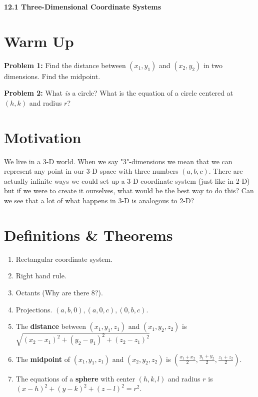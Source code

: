 \documentclass[11pt]{article}
\newcommand{\vs}{\vspace*{.1in}}
\begin{document}
\begin{LARGE}\begin{center}\bf 12.1 Three-Dimensional Coordinate Systems\end{center}
\end{LARGE}

\vs\vs



\section{Warm Up}

\textbf{Problem 1:} Find the distance between $(x_1,y_1)$ and $(x_2,y_2)$ in two dimensions. Find the midpoint. 

\textbf{Problem 2:} What \emph{is} a circle? What is the equation of a circle centered at $(h,k)$ and radius $r$?

\section{Motivation}

We live in a 3-D world. When we say "3"-dimensions we mean that we can represent any point in our 3-D space with three numbers $(a,b,c)$. There are actually infinite ways we could set up a 3-D coordinate system (just like in 2-D) but if we were to create it ourselves, what would be the best way to do this? Can we see that a lot of what happens in 3-D is analogous to 2-D? 


\section{Definitions \& Theorems}

\begin{enumerate}
    \item  Rectangular coordinate system.
    \item  Right hand rule.
    \item Octants (Why are there 8?).
    \item  Projections. $(a,b,0), (a,0,c), (0,b,c)$.

\item  The \textbf{distance} between $(x_1,y_1,z_1)$ and $(x_1,y_2,z_2)$ is $\sqrt{(x_2-x_1)^2+(y_2-y_1)^2+(z_2-z_1)^2}$

\item  The \textbf{midpoint} of $(x_1,y_1,z_1)$ and $(x_2,y_2,z_2)$ is $(\frac{x_1+x_2}{2},\frac{y_1+y_2}{2},\frac{z_1+z_2}{2})$.


\item The equations of a \textbf{sphere} with center $(h,k,l)$ and radius $r$ is $(x-h)^2+(y-k)^2+(z-l)^2 = r^2$.

\end{enumerate}
\end{document}
